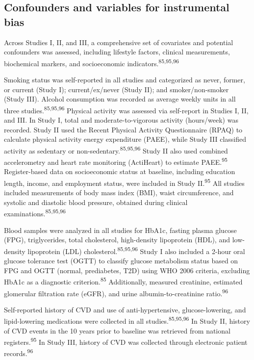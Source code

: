 \documentclass[
  a4paper,
  headsepline=true,
  open=left]{scrbook}
\begin{document}
\hypertarget{confounders-and-variables-for-instrumental-bias}{%
\subsection{Confounders and variables for instrumental
bias}\label{confounders-and-variables-for-instrumental-bias}}

Across Studies I, II, and III, a comprehensive set of covariates and
potential confounders was assessed, including lifestyle factors,
clinical measurements, biochemical markers, and socioeconomic
indicators.\textsuperscript{85,95,96}

Smoking status was self-reported in all studies and categorized as
never, former, or current (Study I); current/ex/never (Study II); and
smoker/non-smoker (Study III). Alcohol consumption was recorded as
average weekly units in all three studies.\textsuperscript{85,95,96}
Physical activity was assessed via self-report in Studies I, II, and
III. In Study I, total and moderate-to-vigorous activity (hours/week)
was recorded. Study II used the Recent Physical Activity Questionnaire
(RPAQ) to calculate physical activity energy expenditure (PAEE), while
Study III classified activity as sedentary or
non-sedentary.\textsuperscript{85,95,96} Study II also used combined
accelerometry and heart rate monitoring (ActiHeart) to estimate
PAEE.\textsuperscript{95} Register-based data on socioeconomic status at
baseline, including education length, income, and employment status,
were included in Study II.\textsuperscript{95} All studies included
measurements of body mass index (BMI), waist circumference, and systolic
and diastolic blood pressure, obtained during clinical
examinations.\textsuperscript{85,95,96}

Blood samples were analyzed in all studies for HbA1c, fasting plasma
glucose (FPG), triglycerides, total cholesterol, high-density
lipoprotein (HDL), and low-density lipoprotein (LDL)
cholesterol.\textsuperscript{85,95,96} Study I also included a 2-hour
oral glucose tolerance test (OGTT) to classify glucose metabolism status
based on FPG and OGTT (normal, prediabetes, T2D) using WHO 2006
criteria, excluding HbA1c as a diagnostic criterion.\textsuperscript{85}
Additionally, measured creatinine, estimated glomerular filtration rate
(eGFR), and urine albumin-to-creatinine ratio.\textsuperscript{96}

Self-reported history of CVD and use of anti-hypertensive,
glucose-lowering, and lipid-lowering medications were collected in all
studies.\textsuperscript{85,95,96} In Study II, history of CVD events in
the 10 years prior to baseline was retrieved from national
registers.\textsuperscript{95} In Study III, history of CVD was
collected through electronic patient records.\textsuperscript{96}
\end{document}
